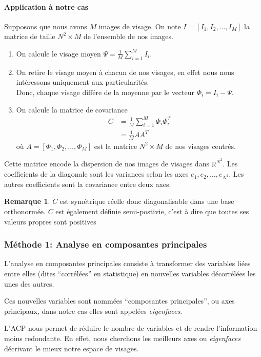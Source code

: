 \documentclass[12pt,french]{article}
\theoremstyle{plain}
\theoremstyle{definition}
\newtheorem{rmq}{Remarque}
\begin{document}
\paragraph{Application à notre cas}
Supposons que nous avons $M$ images de visage. On note $I = [I_1, I_2, \dotsc, I_M]$ la matrice de taille $N^2 \times M$ de l'ensemble de nos images.
\begin{enumerate}
\item On calcule le visage moyen $\Psi = \frac{1}{M}\displaystyle\sum_{i=1}^{M} I_i$.
\item On retire le visage moyen à chacun de nos visages, en effet nous nous intéressons uniquement aux particularités.\\
  Donc, chaque visage différe de la moyenne par le vecteur $\Phi_i = I_i - \Psi$.
\item On calcule la matrice de covariance
  \begin{align*}    
    C &= \frac{1}{M} \displaystyle\sum_{i=1}^{M} \Phi_i \Phi_i^T \\
      &= \frac{1}{M} AA^T 
  \end{align*}
  où $A = [\Phi_1,\Phi_2,\dotsc,\Phi_M]$ est la matrice $N^2 \times M$ de nos visages centrés.
\end{enumerate}
Cette matrice encode la dispersion de nos images de visages dans $\mathbb{R}^{N^2}$. Les coefficients de la diagonale sont les variances selon les axes $e_1, e_2, \dots, e_{N^2}$.
Les autres coefficients sont la covariance entre deux axes.

\begin{rmq}
  $C$ est symétrique réelle donc diagonalisable dans une base orthonormée. $C$ est également définie semi-postivie, c'est à dire que toutes ses valeurs propres sont positives
\end{rmq}

\subsubsection{Méthode 1: Analyse en composantes principales}
L'analyse en composantes principales consiste à transformer des variables liées entre elles (dites ``corrélées'' en statistique) en nouvelles variables décorrélées les unes des autres.

Ces nouvelles variables sont nommées ``composantes principales'', ou axes principaux, dans notre cas elles sont appelées \emph{eigenfaces}.

L'ACP nous permet de réduire le nombre de variables et de rendre l'information moins redondante. En effet, nous cherchons les meilleurs axes ou \emph{eigenfaces} décrivant le mieux notre espace de visages.
\end{document}
